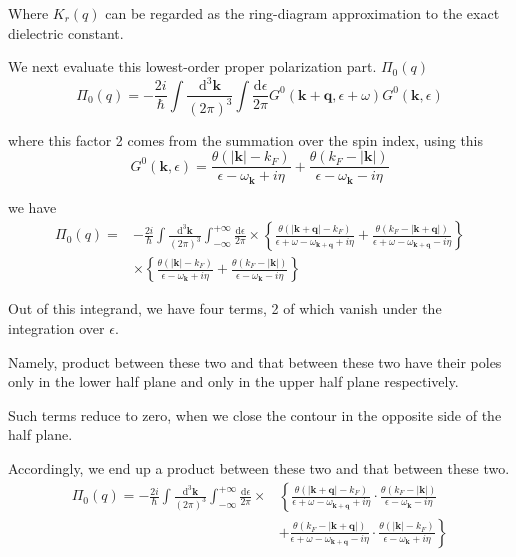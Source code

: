 Where $K_r(q)$ can be regarded as the ring-diagram approximation to the exact dielectric constant.

We next evaluate this lowest-order proper polarization part. $\Pi_0(q)$
\begin{equation} \label{Eqs2.8.12}
\Pi_0(q) = - \frac{2i}{\hbar} \int \frac{\mathrm{d}^3 \mathbf{k}}{(2\pi)^3} \int \frac{\mathrm{d} \epsilon}{2\pi} G^0(\mathbf{k}+\mathbf{q},\epsilon+\omega) G^0(\mathbf{k},\epsilon)
\end{equation}

where this factor 2 comes from the summation over the spin index, using this
\begin{equation} \label{Eqs2.8.13}
G^0(\mathbf{k},\epsilon) = \frac{\theta(|\mathbf{k}|-k_F)}{\epsilon-\omega_{\mathbf{k}}+i \eta} + \frac{\theta(k_F - |\mathbf{k}|)}{\epsilon-\omega_{\mathbf{k}}-i \eta}
\end{equation}

we have
\[\begin{split}\Pi_0(q) =&- \frac{2i}{\hbar} \int \frac{\mathrm{d}^3 \mathbf{k}}{(2\pi)^3} \int_{-\infty}^{+\infty} \frac{\mathrm{d} \epsilon}{2\pi} \times \left\{ \frac{\theta(|\mathbf{k}+\mathbf{q}|-k_F)}{\epsilon+\omega-\omega_{\mathbf{k}+\mathbf{q}} +i \eta} + \frac{\theta(k_F - |\mathbf{k}+\mathbf{q}|)}{\epsilon + \omega - \omega_{\mathbf{k}+\mathbf{q}}-i \eta} \right\}\\
&\times \left\{ \frac{\theta(|\mathbf{k}|-k_F)}{\epsilon-\omega_{\mathbf{k}} +i \eta} + \frac{\theta(k_F - |\mathbf{k}|)}{\epsilon - \omega_{\mathbf{k}}-i \eta} \right\} \end{split}\]

Out of this integrand, we have four terms, 2 of which vanish under the integration over $\epsilon$.

Namely, product between these two and that between these two have their poles only in the lower half plane and only in the upper half plane respectively.

Such terms reduce to zero, when we close the contour in the opposite side of the half plane.

Accordingly, we end up a product between these two and that between these two.\[\begin{split}\Pi_0(q) =- \frac{2i}{\hbar} \int \frac{\mathrm{d}^3 \mathbf{k}}{(2\pi)^3} \int_{-\infty}^{+\infty} \frac{\mathrm{d} \epsilon}{2\pi} \times &\left\{  \frac{\theta(|\mathbf{k}+\mathbf{q}|-k_F)}{\epsilon+\omega-\omega_{\mathbf{k}+\mathbf{q}} +i \eta} \cdot \frac{\theta(k_F - |\mathbf{k}|)}{\epsilon - \omega_{\mathbf{k}}-i \eta} \right.\\
&\left.+ \frac{\theta(k_F - |\mathbf{k}+\mathbf{q}|)}{\epsilon + \omega - \omega_{\mathbf{k}+\mathbf{q}}-i \eta} \cdot \frac{\theta(|\mathbf{k}|-k_F)}{\epsilon-\omega_{\mathbf{k}} +i \eta} \right\} 
 \end{split}\]

